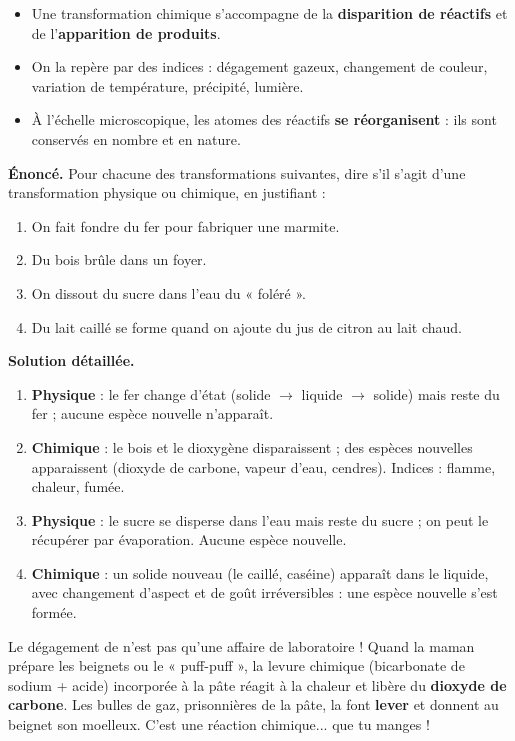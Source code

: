 \documentclass[11pt]{article}
\begin{document}
\begin{aretenir}
\begin{itemize}
\item Une transformation chimique s'accompagne de la \textbf{disparition de réactifs} et de l'\textbf{apparition de produits}.
\item On la repère par des indices : dégagement gazeux, changement de couleur, variation de température, précipité, lumière.
\item À l'échelle microscopique, les atomes des réactifs \textbf{se réorganisent} : ils sont conservés en nombre et en nature.
\end{itemize}
\end{aretenir}

\begin{exoresolu}
\textbf{Énoncé.} Pour chacune des transformations suivantes, dire s'il s'agit d'une transformation physique ou chimique, en justifiant :
\begin{enumerate}
\item On fait fondre du fer pour fabriquer une marmite.
\item Du bois brûle dans un foyer.
\item On dissout du sucre dans l'eau du « foléré ».
\item Du lait caillé se forme quand on ajoute du jus de citron au lait chaud.
\end{enumerate}
\tcblower
\textbf{Solution détaillée.}
\begin{enumerate}
\item \textbf{Physique} : le fer change d'état (solide $\to$ liquide $\to$ solide) mais reste du fer ; aucune espèce nouvelle n'apparaît.
\item \textbf{Chimique} : le bois et le dioxygène disparaissent ; des espèces nouvelles apparaissent (dioxyde de carbone, vapeur d'eau, cendres). Indices : flamme, chaleur, fumée.
\item \textbf{Physique} : le sucre se disperse dans l'eau mais reste du sucre ; on peut le récupérer par évaporation. Aucune espèce nouvelle.
\item \textbf{Chimique} : un solide nouveau (le caillé, caséine) apparaît dans le liquide, avec changement d'aspect et de goût irréversibles : une espèce nouvelle s'est formée.
\end{enumerate}
\end{exoresolu}

\begin{savaistu}
Le dégagement de  n'est pas qu'une affaire de laboratoire ! Quand la maman prépare les beignets ou le « puff-puff », la levure chimique (bicarbonate de sodium + acide) incorporée à la pâte réagit à la chaleur et libère du \textbf{dioxyde de carbone}. Les bulles de gaz, prisonnières de la pâte, la font \textbf{lever} et donnent au beignet son moelleux. C'est une réaction chimique... que tu manges !
\end{savaistu}
\end{document}
